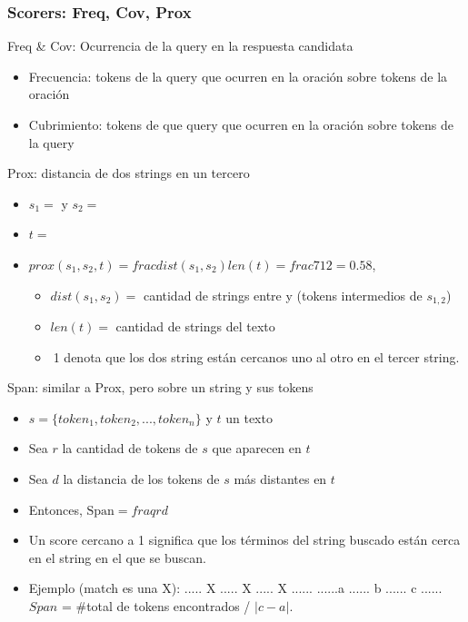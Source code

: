 \begin{frame}
\frametitle{Scorers: Freq, Cov, Prox}
  \begin{block}{Freq \& Cov: Ocurrencia de la query en la respuesta candidata}
  \begin{itemize}
      \item Frecuencia: tokens de la query que ocurren en la oración sobre tokens de la oración 
      \item Cubrimiento: tokens de que query que ocurren en la oración sobre tokens de la query
  \end{itemize}
  \end{block}
  \begin{block}{Prox: distancia de dos strings en un tercero}
  \begin{itemize}
      \item $s_1=$ y $s_2=$
      \item $t=$
      \item $prox(s_1, s_2, t)= frac{dist(s_1, s_2)}{len(t)} = frac{7}{12} = 0.58 $, 
      \begin{itemize}
          \item $dist(s_1, s_2)=$ cantidad de strings entre  y  (tokens intermedios de $s_{1,2}$)
          \item $len(t)=$ cantidad de strings del texto
          \item $~$1 denota que los dos string están cercanos uno al otro en el tercer string.
      \end{itemize}
  \end{itemize}
  \end{block}
  \begin{block}{Span: similar a Prox, pero sobre un string y sus tokens}
  \begin{itemize}
  \item $s = \{token_1, token_2, ..., token_n\}$ y $t$ un texto
  \item Sea $r$ la cantidad de tokens de $s$ que aparecen en $t$
  \item Sea $d$ la distancia de los tokens de $s$ más distantes en $t$
  \item Entonces, $\text{Span}=fraq{r}{d}$
  \item Un score cercano a 1 significa que los términos del string buscado están cerca en el string en el que se buscan.
  \item Ejemplo (match es una X):
        ..... X ..... X ..... X ...... \newline
        ......a ...... b ...... c ...... \newline
    $Span$ = \#total de tokens encontrados / $| c - a |$.
  \end{itemize}
  \end{block}
\end{frame}


